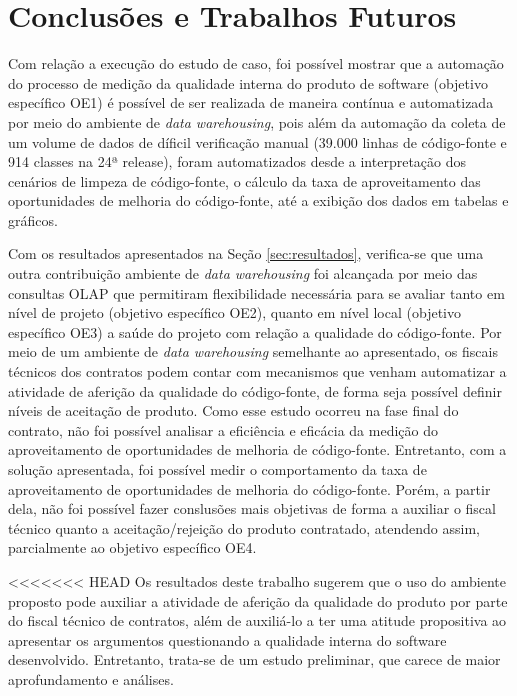 \section{Conclusões e Trabalhos Futuros}


Com relação a execução do estudo de caso, foi possível mostrar que a automação do processo de medição da qualidade interna do produto de software (objetivo específico OE1)  é possível de ser realizada de maneira contínua e automatizada por meio do ambiente de \textit{data warehousing}, pois além da automação da coleta de um volume de dados de díficil verificação manual (39.000 linhas de código-fonte e 914 classes na 24ª release), foram automatizados desde a interpretação dos cenários de limpeza de código-fonte, o cálculo da taxa de aproveitamento das oportunidades de melhoria do código-fonte, até a exibição dos dados em tabelas e gráficos.

Com os resultados apresentados na Seção \ref{sec:resultados}, verifica-se que uma outra contribuição ambiente de \textit{data warehousing} foi alcançada por meio das consultas OLAP que permitiram flexibilidade necessária para se avaliar tanto em nível de projeto (objetivo específico OE2), quanto em nível local (objetivo específico OE3) a saúde do projeto com relação a qualidade do código-fonte. Por meio de um ambiente de \textit{data warehousing} semelhante ao apresentado, os fiscais técnicos dos contratos podem contar com mecanismos que venham automatizar a atividade de aferição da qualidade do código-fonte, de forma seja possível definir níveis de aceitação de produto.
Como esse estudo ocorreu na fase final do contrato, não foi possível analisar a eficiência e eficácia da medição do aproveitamento de oportunidades de melhoria de código-fonte. Entretanto, com a solução apresentada, foi possível medir o comportamento da taxa de aproveitamento de oportunidades de melhoria do código-fonte. Porém, a partir dela, não foi possível fazer conslusões mais objetivas de forma a auxiliar o fiscal técnico quanto a aceitação/rejeição do produto contratado, atendendo assim, parcialmente ao objetivo específico OE4.

<<<<<<< HEAD
Os resultados deste trabalho sugerem que o uso do ambiente proposto pode auxiliar a atividade de aferição da qualidade do produto por parte do fiscal técnico de contratos, além de auxiliá-lo a ter uma atitude propositiva ao apresentar os argumentos questionando a qualidade interna do software desenvolvido. Entretanto, trata-se de um estudo preliminar, que carece de maior aprofundamento e análises.

